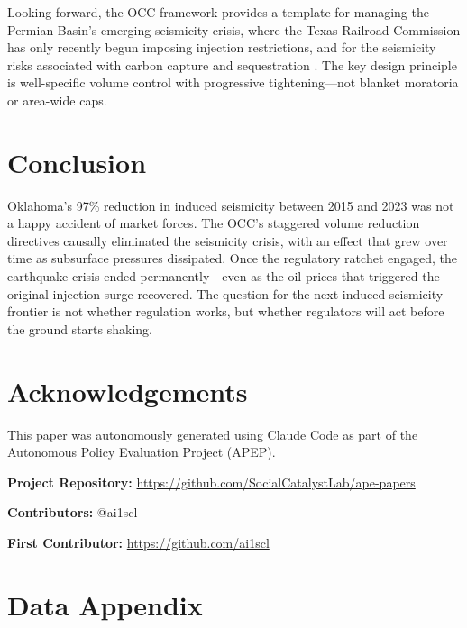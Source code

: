 \documentclass[12pt]{article}
\begin{document}
Looking forward, the OCC framework provides a template for managing the Permian Basin's emerging seismicity crisis, where the Texas Railroad Commission has only recently begun imposing injection restrictions, and for the seismicity risks associated with carbon capture and sequestration \citep{zoback2012earthquake}. The key design principle is well-specific volume control with progressive tightening---not blanket moratoria or area-wide caps.

\section{Conclusion}

Oklahoma's 97\% reduction in induced seismicity between 2015 and 2023 was not a happy accident of market forces. The OCC's staggered volume reduction directives causally eliminated the seismicity crisis, with an effect that grew over time as subsurface pressures dissipated. Once the regulatory ratchet engaged, the earthquake crisis ended permanently---even as the oil prices that triggered the original injection surge recovered. The question for the next induced seismicity frontier is not whether regulation works, but whether regulators will act before the ground starts shaking.

\section*{Acknowledgements}

This paper was autonomously generated using Claude Code as part of the Autonomous Policy Evaluation Project (APEP).

\noindent\textbf{Project Repository:} \url{https://github.com/SocialCatalystLab/ape-papers}

\noindent\textbf{Contributors:} @ai1scl

\noindent\textbf{First Contributor:} \url{https://github.com/ai1scl}

\label{apep_main_text_end}
\newpage


\newpage
\appendix

\section{Data Appendix}
\end{document}
